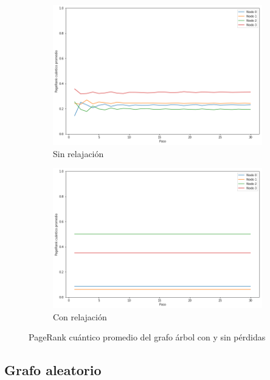 \begin{figure}[H]
    \centering
    \begin{subfigure}[m]{0.45\textwidth}
        \centering
        \includegraphics[width=0.9\linewidth]{img/tree-mean-lossless.png}
        \caption{Sin relajación}
    \end{subfigure}
    \begin{subfigure}[m]{0.45\textwidth}
        \centering
        \includegraphics[width=0.9\linewidth]{img/tree-mean-lossy.png}
        \caption{Con relajación}
    \end{subfigure}
    \caption[PageRank cuántico promedio del grafo árbol con y sin pérdidas]{PageRank cuántico promedio del grafo árbol con y sin pérdidas}
    \label{fig:meantreelossy}
\end{figure}

\subsection{Grafo aleatorio}

